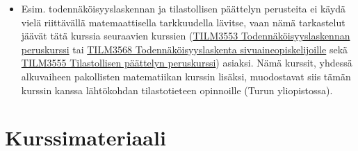 \documentclass[
]{book}
\providecommand{\tightlist}{%
  \setlength{\itemsep}{0pt}\setlength{\parskip}{0pt}}
\begin{document}
\begin{itemize}
  \begin{itemize}
  \tightlist
  \item
    Esim. todennäköisyyslaskennan ja tilastollisen päättelyn perusteita ei käydä vielä riittävällä matemaattisella tarkkuudella lävitse, vaan nämä tarkastelut jäävät tätä kurssia seuraavien kurssien (\href{https://opas.peppi.utu.fi/fi/opintojakso/TILM3553/1734?period=2022-2024}{TILM3553 Todennäköisyyslaskennan peruskurssi} tai \href{https://opas.peppi.utu.fi/fi/opintojakso/TILM3568/3385?period=2\%20022-2024}{TILM3568 Todennäköisyyslaskenta sivuaineopiskelijoille} sekä \href{https://opas.peppi.utu.fi/fi/opintojakso/TILM3555/1731?period=2022-2024}{TILM3555 Tilastollisen päättelyn peruskurssi}) asiaksi. Nämä kurssit, yhdessä alkuvaiheen pakollisten matematiikan kurssin lisäksi, muodostavat siis tämän kurssin kanssa lähtökohdan tilastotieteen opinnoille (Turun yliopistossa).
  \end{itemize}
\end{itemize}

\hypertarget{kurssimateriaali}{%
\chapter*{Kurssimateriaali}\label{kurssimateriaali}}
\end{document}
